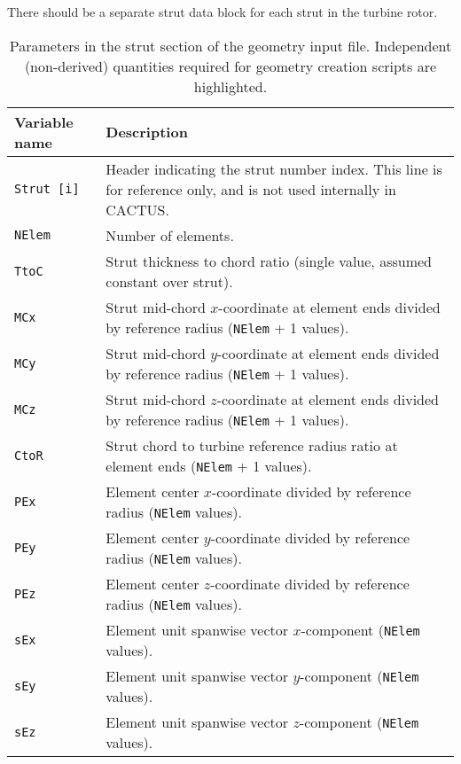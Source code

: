 There should be a separate strut data block for each strut in the turbine rotor.

\begin{longtable}{p{}p{}}
\caption[Parameters in the strut section of the geometry input file.]{Parameters in the strut section of the geometry input file. Independent (non-derived) quantities required for geometry creation scripts are highlighted.} \label{tbl:geometry_input_params_strut} \\
\toprule
Variable name & Description \\ \midrule
\texttt{Strut [i]} & Header indicating the strut number index. This line is for reference only, and is not used internally in CACTUS. \\
\rowcolor{highlightcolor}\texttt{NElem}   & Number of elements. \\
\rowcolor{highlightcolor}\texttt{TtoC}    & Strut thickness to chord ratio (single value, assumed constant over strut). \\
\rowcolor{highlightcolor}\texttt{MCx}     & Strut mid-chord $x$-coordinate at element ends divided by reference radius (\texttt{NElem} + 1 values). \\
\rowcolor{highlightcolor}\texttt{MCy}     & Strut mid-chord $y$-coordinate at element ends divided by reference radius (\texttt{NElem} + 1 values). \\
\rowcolor{highlightcolor}\texttt{MCz}     & Strut mid-chord $z$-coordinate at element ends divided by reference radius (\texttt{NElem} + 1 values). \\
\rowcolor{highlightcolor}\texttt{CtoR}    & Strut chord to turbine reference radius ratio at element ends (\texttt{NElem} + 1 values). \\
\texttt{PEx}     & Element center $x$-coordinate divided by reference radius (\texttt{NElem} values). \\
\texttt{PEy}     & Element center $y$-coordinate divided by reference radius (\texttt{NElem} values). \\
\texttt{PEz}     & Element center $z$-coordinate divided by reference radius (\texttt{NElem} values). \\
\texttt{sEx}     & Element unit spanwise vector $x$-component (\texttt{NElem} values). \\
\texttt{sEy}     & Element unit spanwise vector $y$-component (\texttt{NElem} values). \\
\texttt{sEz}     & Element unit spanwise vector $z$-component (\texttt{NElem} values). \\

\end{longtable}
